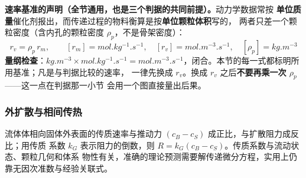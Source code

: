 \begin{principle}
\textbf{速率基准的声明（全节通用，也是三个判据的共同前提）。}动力学数据常按
\textbf{单位质量}催化剂报出，而传递过程的物料衡算是按\textbf{单位颗粒体积}写的，
两者只差一个颗粒密度（含内孔的颗粒密度 $\rho_p$，不是骨架密度）：
\begin{equation}
r_v=\rho_p\,r_m,\qquad
[r_m]=\unit{mol.kg^{-1}.s^{-1}},\quad
[r_v]=\unit{mol.m^{-3}.s^{-1}},\quad
[\rho_p]=\unit{kg.m^{-3}}
\label{eq:ch10-basis}
\end{equation}
\textbf{量纲检查}：$\unit{kg.m^{-3}}\times\unit{mol.kg^{-1}.s^{-1}}
=\unit{mol.m^{-3}.s^{-1}}$，闭合。本节的每一式都标明所用基准；凡是与判据比较的速率，
一律先换成 $r_v$。换成 $r_v$ 之后\textbf{不要再乘一次 $\rho_p$}——这一点在判据那一小节
会用一个图直接量出后果。
\end{principle}

\subsubsection{外扩散与相间传热}

流体体相向固体外表面的传质速率与推动力 $(c_B-c_S)$ 成正比，与扩散阻力成反比；用传质
系数 $k_G$ 表示阻力的倒数，则 $R=k_G(c_B-c_S)$。传质系数与流动状态、颗粒几何和体系
物性有关，准确的理论预测需要解传递微分方程，实用上仍靠无因次准数与经验关联式。

